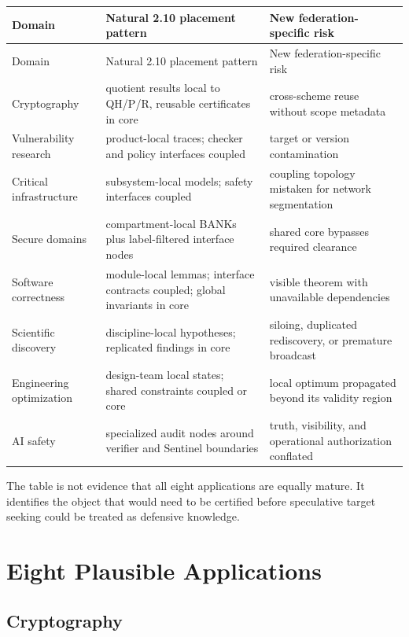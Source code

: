\documentclass[11pt,oneside]{book}
\theoremstyle{definition}
\theoremstyle{remark}
\begin{document}
\begin{longtable}{>{\raggedright\arraybackslash}p{}>{\raggedright\arraybackslash}p{}>{\raggedright\arraybackslash}p{}}
\toprule
Domain & Natural 2.10 placement pattern & New federation-specific risk \\
\midrule
\endfirsthead
\toprule
Domain & Natural 2.10 placement pattern & New federation-specific risk \\
\midrule
\endhead
Cryptography & quotient results local to QH/P/R, reusable certificates in core & cross-scheme reuse without scope metadata \\
Vulnerability research & product-local traces; checker and policy interfaces coupled & target or version contamination \\
Critical infrastructure & subsystem-local models; safety interfaces coupled & coupling topology mistaken for network segmentation \\
Secure domains & compartment-local BANKs plus label-filtered interface nodes & shared core bypasses required clearance \\
Software correctness & module-local lemmas; interface contracts coupled; global invariants in core & visible theorem with unavailable dependencies \\
Scientific discovery & discipline-local hypotheses; replicated findings in core & siloing, duplicated rediscovery, or premature broadcast \\
Engineering optimization & design-team local states; shared constraints coupled or core & local optimum propagated beyond its validity region \\
AI safety & specialized audit nodes around verifier and Sentinel boundaries & truth, visibility, and operational authorization conflated \\
\bottomrule
\end{longtable}

The table is not evidence that all eight applications are equally mature. It identifies the object
that would need to be certified before speculative target seeking could be treated as defensive
knowledge.

\part{Eight Plausible Applications}

\chapter{Cryptography}
\label{ch:crypto}
\end{document}
